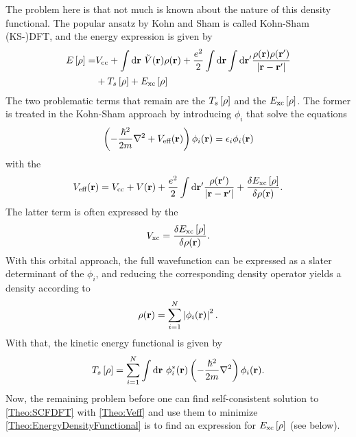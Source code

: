 \documentclass[8.5pt,twoside,twocolumn]{article}
\newcommand\di{\te{d}}
\renewcommand\r{\bo r}
\newcommand\indr{\enmat{\int\di \r}}
\theoremstyle{standard}
\begin{document}
The problem here is that not much is known about the nature of this density functional. The
popular ansatz by Kohn and Sham \cite{KohnSham} is called Kohn-Sham (KS-)DFT, and the energy
expression is given by
\newcommand\er{\ed{\rho}}
\newcommand\exc{E_{\te{xc}}}
\begin{equation}
\begin{aligned}
 E\ed{\rho}=&\vcc+\indr\ \tilde V(\r) \rho(\r) + \frac {e^2}{2}\indr\indr' \frac {\rho(\r)\rho(\r')}{\abs{\r-\r'}}\\
 &+T_s 	\ed{\rho}+\exc\ed{\rho}
\end{aligned}
\label{Theo:EnergyDensityFunctional}
\end{equation}
The two problematic terms that remain are the  $T_s\er$ and the
 $\exc\er$. The former is treated in the Kohn-Sham approach
by  introducing  $\phi_i$ that solve the equations
\newcommand\veff{V_{\te{eff}}}
\newcommand\hm{\frac{\hbar^2}{2m}}
\begin{equation}
\rb{-\frac{\hbar^2}{2m} \nabla^2 + \veff(\r)} \phi_i(\r) = \eps_i \phi_i(\r)
\label{Theo:SCFDFT}
\end{equation}
with the 
\begin{equation}
\veff(\r)=\vcc+V(\r) + \frac {e^2}2 \indr' \frac{\rho(\r')}{\abs{\r-\r'}}+\delti{\exc\er}{\rho(\r)}.
\label{Theo:Veff}
\end{equation}
The latter term is often expressed by the 
\newcommand\vxc{V_{\te{xc}}}
\begin{equation}
\vxc=\delti{\exc\er}{\rho(\r)}.
\label{Theo:Vxc}
\end{equation}
With this orbital approach, the full wavefunction can be expressed as a slater determinant of 
the $\phi_i$, and reducing the corresponding density operator yields a density according to
\begin{equation}
\rho(\r)=\sum_{i=1}^N \abs{\phi_i(\r)}^2.
\label{Theo:RhoByPhi}
\end{equation}
With that, the kinetic energy functional is given by
\begin{equation}
T_s\er=\sum_{i=1}^N \indr\ \phi_i^*(\r) \rb{-\hm \nabla^2} \phi_i(\r).
\end{equation}
Now, the remaining problem before one can find self-consistent solution to \eqref{Theo:SCFDFT}
with \eqref{Theo:Veff} and use them to minimize \eqref{Theo:EnergyDensityFunctional} is to
find an expression for $\exc\er$ (see below).
\end{document}
